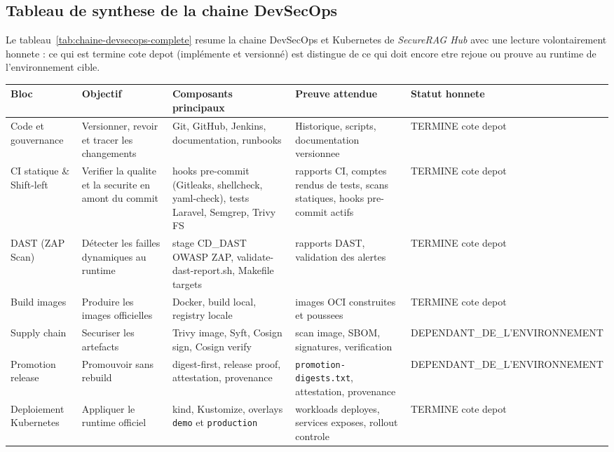 \subsection{Tableau de synthese de la chaine DevSecOps}
\label{sec:tableau-chaine-devsecops-complet}

Le tableau~\ref{tab:chaine-devsecops-complete} resume la chaine DevSecOps et Kubernetes de \textit{SecureRAG Hub} avec une lecture volontairement honnete : ce qui est termine cote depot (implémente et versionné) est distingue de ce qui doit encore etre rejoue ou prouve au runtime de l'environnement cible.

\begin{table}[h]
\centering
\scriptsize
\renewcommand{\arraystretch}{1.2}
\begin{tabular}{|p{2.2cm}|p{2.9cm}|p{4.0cm}|p{2.3cm}|p{2.4cm}|}
\hline
\textbf{Bloc} & \textbf{Objectif} & \textbf{Composants principaux} & \textbf{Preuve attendue} & \textbf{Statut honnete} \\
\hline
Code et gouvernance & Versionner, revoir et tracer les changements & Git, GitHub, Jenkins, documentation, runbooks & Historique, scripts, documentation versionnee & TERMINE cote depot \\
\hline
CI statique \& Shift-left & Verifier la qualite et la securite en amont du commit & hooks pre-commit (Gitleaks, shellcheck, yaml-check), tests Laravel, Semgrep, Trivy FS & rapports CI, comptes rendus de tests, scans statiques, hooks pre-commit actifs & TERMINE cote depot \\
\hline
DAST (ZAP Scan) & Détecter les failles dynamiques au runtime & stage CD\_DAST OWASP ZAP, validate-dast-report.sh, Makefile targets & rapports DAST, validation des alertes & TERMINE cote depot \\
\hline
Build images & Produire les images officielles & Docker, build local, registry locale & images OCI construites et poussees & TERMINE cote depot \\
\hline
Supply chain & Securiser les artefacts & Trivy image, Syft, Cosign sign, Cosign verify & scan image, SBOM, signatures, verification & DEPENDANT\_DE\_L'ENVIRONNEMENT \\
\hline
Promotion release & Promouvoir sans rebuild & digest-first, release proof, attestation, provenance & \texttt{promotion-digests.txt}, attestation, provenance & DEPENDANT\_DE\_L'ENVIRONNEMENT \\
\hline
Deploiement Kubernetes & Appliquer le runtime officiel & kind, Kustomize, overlays \texttt{demo} et \texttt{production} & workloads deployes, services exposes, rollout controle & TERMINE cote depot \\

\end{tabular}
\end{table}
